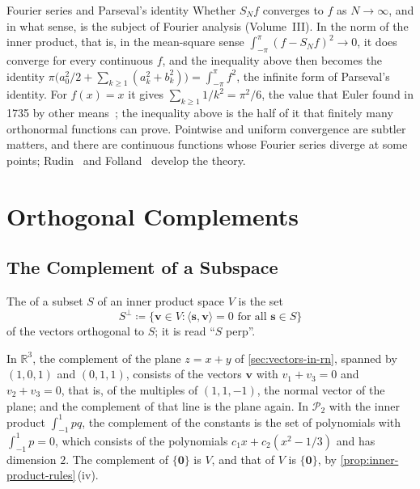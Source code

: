 \begin{note}{Fourier series and Parseval's identity}
Whether $S_Nf$ converges to $f$ as $N\to\infty$, and in what sense, is the subject of Fourier analysis (Volume~III). In the norm of the inner product, that is, in the mean-square sense $\int_{-\pi}^\pi(f-S_Nf)^2\to0$, it does converge for every continuous $f$, and the inequality above then becomes the identity $\pi\bigl(a_0^2/2+\sum_{k\ge1}(a_k^2+b_k^2)\bigr)=\int_{-\pi}^\pi f^2$, the infinite form of Parseval's identity. For $f(x)=x$ it gives $\sum_{k\ge1}1/k^2=\pi^2/6$, the value that Euler found in 1735 by other means~\cite{hairer1996analysis}; the inequality above is the half of it that finitely many orthonormal functions can prove. Pointwise and uniform convergence are subtler matters, and there are continuous functions whose Fourier series diverge at some points; Rudin~\cite[Chap.~8]{rudin1976} and Folland~\cite[Chap.~8]{folland1999} develop the theory.
\end{note}

\section{Orthogonal Complements}
\label{sec:orthogonal-complements}

\subsection{The Complement of a Subspace}

\begin{definition}
\label{def:orthogonal-complement}
The  of a subset $S$ of an inner product space $V$ is the set
\[
S^\perp\coloneqq\{\mathbf v\in V: \langle\mathbf s,\mathbf v\rangle=0\text{ for all }\mathbf s\in S\}
\]
of the vectors orthogonal to $S$; it is read ``$S$ perp''.
\end{definition}

In $\mathbb R^3$, the complement of the plane $z=x+y$ of \cref{sec:vectors-in-rn}, spanned by $(1,0,1)$ and $(0,1,1)$, consists of the vectors $\mathbf v$ with $v_1+v_3=0$ and $v_2+v_3=0$, that is, of the multiples of $(1,1,-1)$, the normal vector of the plane; and the complement of that line is the plane again. In $\mathcal P_2$ with the inner product $\int_{-1}^1pq$, the complement of the constants is the set of polynomials with $\int_{-1}^1p=0$, which consists of the polynomials $c_1x+c_2(x^2-1/3)$ and has dimension $2$. The complement of $\{\mathbf 0\}$ is $V$, and that of $V$ is $\{\mathbf 0\}$, by \cref{prop:inner-product-rules}\,(iv).

